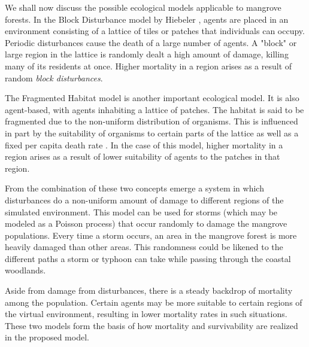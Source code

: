 We shall now discuss the possible ecological models applicable to mangrove forests. In the Block Disturbance model by Hiebeler \cite{HiebelerFragmentedHabitat2011}, agents are placed in an environment consisting of a lattice of tiles or patches that individuals can occupy. Periodic disturbances cause the death of a large number of agents. A "block" or large region in the lattice is randomly dealt a high amount of damage, killing many of its residents at once. Higher mortality in a region arises as a result of random \emph{block disturbances}.

The Fragmented Habitat model is another important ecological model. It is also agent-based, with agents inhabiting a lattice of patches. The habitat is said to be fragmented due to the non-uniform distribution of organisms. This is influenced in part by the suitability of organisms to certain parts of the lattice as well as a fixed per capita death rate \cite{Hiebeler2000}. In the case of this model, higher mortality in a region arises as a result of lower suitability of agents to the patches in that region.

From the combination of these two concepts emerge a system in which disturbances do a non-uniform amount of damage to different regions of the simulated environment. This model can be used for storms (which may be modeled as a Poisson process) that occur randomly to damage the mangrove populations. Every time a storm occurs, an area in the mangrove forest is more heavily damaged than other areas. This randomness could be likened to the different paths a storm or typhoon can take while passing through the coastal woodlands. 

Aside from damage from disturbances, there is a steady backdrop of mortality among the population. Certain agents may be more suitable to certain regions of the virtual environment, resulting in lower mortality rates in such situations. These two models form the basis of how mortality and survivability are realized in the proposed model.